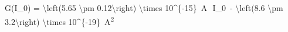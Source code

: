 G(I_0) = \SI[parse-numbers = false]{\left(5.65 \pm 0.12\right) \times 10^{-15}}{\ampere}\, \cdot \,I_0\, - \SI[parse-numbers = false]{\left(8.6 \pm 3.2\right) \times 10^{-19}}{\ampere^2}